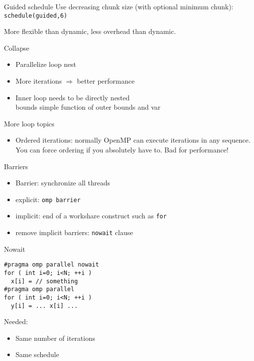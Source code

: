 \begin{numberedframe}{Guided schedule}
  Use decreasing chunk size (with optional minimum
  chunk): \texttt{schedule(guided,6)}

  More flexible than dynamic, less overhead than dynamic.    
\end{numberedframe}

\begin{numberedframe}{Collapse}
  \begin{itemize}
  \item Parallelize loop nest
  \item More iterations $\Rightarrow$ better performance
  \item Inner loop needs to be directly nested\\
    bounds simple function of outer bounds and var
  \end{itemize}
\end{numberedframe}

\begin{numberedframe}{More loop topics}
  \begin{itemize}
  \item Ordered iterations: normally OpenMP can execute iterations in
    any sequence. You can force ordering if you absolutely have
    to. Bad for performance!
  \end{itemize}
\end{numberedframe}

\begin{numberedframe}{Barriers}
  \begin{itemize}
  \item Barrier: synchronize all threads
  \item explicit: \lstinline{omp barrier}
  \item implicit: end of a workshare construct such as \lstinline{for}
  \item remove implicit barriers: \lstinline{nowait} clause
  \end{itemize}
\end{numberedframe}

\begin{numberedframe}{Nowait}
\begin{lstlisting}
#pragma omp parallel nowait
for ( int i=0; i<N; ++i )
  x[i] = // something
#pragma omp parallel 
for ( int i=0; i<N; ++i )
  y[i] = ... x[i] ...
\end{lstlisting}
Needed:
  \begin{itemize}
  \item Same number of iterations
  \item Same schedule
  \end{itemize}
\end{numberedframe}

